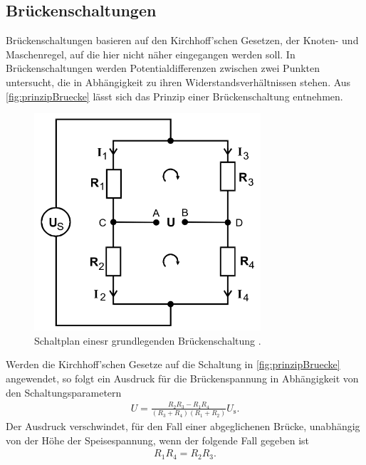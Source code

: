 \subsection{Brückenschaltungen}
Brückenschaltungen basieren auf den Kirchhoff'schen Gesetzen, der Knoten- und Maschenregel, auf die hier nicht näher eingegangen werden soll.
In Brückenschaltungen werden Potentialdifferenzen zwischen zwei Punkten untersucht, die in Abhängigkeit zu ihren Widerstandsverhältnissen
stehen. Aus \autoref{fig:prinzipBruecke} lässt sich das Prinzip einer Brückenschaltung entnehmen.
\begin{figure}[H]
    \centering
    \includegraphics[width=0.75\textwidth]{dateien/PrinzipBrueckenschaltung.png}
    \caption{Schaltplan einesr grundlegenden Brückenschaltung \cite{anleitung}.}
    \label{fig:prinzipBruecke}
\end{figure}
Werden die Kirchhoff'schen Gesetze auf die Schaltung in \autoref{fig:prinzipBruecke} angewendet, so folgt ein Ausdruck
für die Brückenspannung in Abhängigkeit von den Schaltungsparametern
\begin{align*}
    U = \frac{R_2R_3 - R_1R_4}{(R_3+R_4)(R_1+R_2)} U_{\text{s}}  .
\end{align*}
Der Ausdruck verschwindet, für den Fall einer abgeglichenen Brücke, unabhängig von der Höhe der Speisespannung, 
wenn der folgende Fall gegeben ist
\begin{align}
    \label{eqn:abgBr}
    R_1R_4=R_2R_3.
\end{align}


